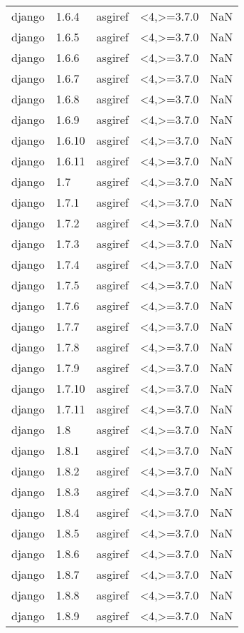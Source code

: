 \begin{tabular}{llllr}
django & 1.6.4 & asgiref & <4,>=3.7.0 & NaN \\
django & 1.6.5 & asgiref & <4,>=3.7.0 & NaN \\
django & 1.6.6 & asgiref & <4,>=3.7.0 & NaN \\
django & 1.6.7 & asgiref & <4,>=3.7.0 & NaN \\
django & 1.6.8 & asgiref & <4,>=3.7.0 & NaN \\
django & 1.6.9 & asgiref & <4,>=3.7.0 & NaN \\
django & 1.6.10 & asgiref & <4,>=3.7.0 & NaN \\
django & 1.6.11 & asgiref & <4,>=3.7.0 & NaN \\
django & 1.7 & asgiref & <4,>=3.7.0 & NaN \\
django & 1.7.1 & asgiref & <4,>=3.7.0 & NaN \\
django & 1.7.2 & asgiref & <4,>=3.7.0 & NaN \\
django & 1.7.3 & asgiref & <4,>=3.7.0 & NaN \\
django & 1.7.4 & asgiref & <4,>=3.7.0 & NaN \\
django & 1.7.5 & asgiref & <4,>=3.7.0 & NaN \\
django & 1.7.6 & asgiref & <4,>=3.7.0 & NaN \\
django & 1.7.7 & asgiref & <4,>=3.7.0 & NaN \\
django & 1.7.8 & asgiref & <4,>=3.7.0 & NaN \\
django & 1.7.9 & asgiref & <4,>=3.7.0 & NaN \\
django & 1.7.10 & asgiref & <4,>=3.7.0 & NaN \\
django & 1.7.11 & asgiref & <4,>=3.7.0 & NaN \\
django & 1.8 & asgiref & <4,>=3.7.0 & NaN \\
django & 1.8.1 & asgiref & <4,>=3.7.0 & NaN \\
django & 1.8.2 & asgiref & <4,>=3.7.0 & NaN \\
django & 1.8.3 & asgiref & <4,>=3.7.0 & NaN \\
django & 1.8.4 & asgiref & <4,>=3.7.0 & NaN \\
django & 1.8.5 & asgiref & <4,>=3.7.0 & NaN \\
django & 1.8.6 & asgiref & <4,>=3.7.0 & NaN \\
django & 1.8.7 & asgiref & <4,>=3.7.0 & NaN \\
django & 1.8.8 & asgiref & <4,>=3.7.0 & NaN \\
django & 1.8.9 & asgiref & <4,>=3.7.0 & NaN \\

\end{tabular}
